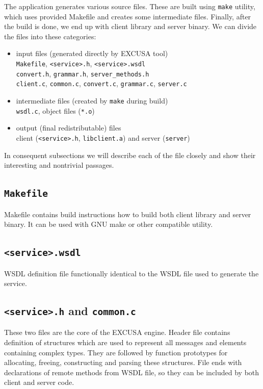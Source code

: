 \documentclass[12pt,notitlepage]{report}
\begin{document}
The application generates various source files. These are built using \texttt{make} utility, which uses provided Makefile and creates some intermediate files. Finally, after the build is done, we end up with client library and server binary. We can divide the files into these categories:

\begin{itemize}
\item input files (generated directly by EXCUSA tool) \\
\texttt{Makefile}, \texttt{<service>.h}, \texttt{<service>.wsdl} \\
\texttt{convert.h}, \texttt{grammar.h}, \texttt{server\_methods.h} \\ 
\texttt{client.c}, \texttt{common.c}, \texttt{convert.c}, \texttt{grammar.c}, \texttt{server.c}
\item intermediate files (created by \texttt{make} during build) \\
 \texttt{wsdl.c}, object files (\texttt{*.o})
\item output (final redistributable) files \\
 client (\texttt{<service>.h}, \texttt{libclient.a}) and server (\texttt{server})
\end{itemize}

In consequent subsections we will describe each of the file closely and show their interesting and nontrivial passages.

\subsection{\texttt{Makefile}}

Makefile contains build instructions how to build both client library and server binary. It can be used with GNU make or other compatible utility.

\subsection{\texttt{<service>.wsdl}}

WSDL definition file functionally identical to the WSDL file used to generate the service.

\subsection{\texttt{<service>.h} and \texttt{common.c}}
\label{serviceh-commonc}
These two files are the core of the EXCUSA engine. Header file contains definition of structures which are used to represent all messages and elements containing complex types. They are followed by function prototypes for allocating, freeing, constructing and parsing these structures. File ends with declarations of remote methods from WSDL file, so they can be included by both client and server code.
\end{document}
